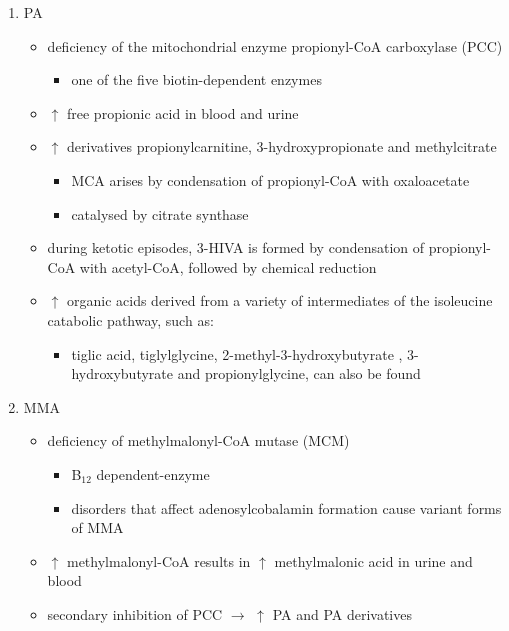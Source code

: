 \documentclass{scrartcl}
\begin{document}
\begin{enumerate}
\item PA
\label{sec:org8d2188c}
\begin{itemize}
\item deficiency of the mitochondrial enzyme propionyl-CoA carboxylase (PCC)
\begin{itemize}
\item one of the five biotin-dependent enzymes
\end{itemize}
\item \(\uparrow\) free propionic acid in blood and urine
\item \(\uparrow\) derivatives propionylcarnitine, 3-hydroxypropionate and methylcitrate
\begin{itemize}
\item MCA arises by condensation of propionyl-CoA with oxaloacetate
\item catalysed by citrate synthase
\end{itemize}
\item during ketotic episodes, 3-HIVA is formed by condensation of
propionyl-CoA with acetyl-CoA, followed by chemical reduction
\item \(\uparrow\) organic acids derived from a variety of intermediates of
the isoleucine catabolic pathway, such as:
\begin{itemize}
\item tiglic acid, tiglylglycine, 2-methyl-3-hydroxybutyrate ,
3-hydroxybutyrate and propionylglycine, can also be found
\end{itemize}
\end{itemize}

\item MMA
\label{sec:org2a13bfc}
\begin{itemize}
\item deficiency of methylmalonyl-CoA mutase (MCM)
\begin{itemize}
\item B\(_{\text{12}}\) dependent-enzyme
\item disorders that affect adenosylcobalamin formation cause variant
forms of MMA
\end{itemize}
\item \(\uparrow\) methylmalonyl-CoA results in \(\uparrow\) methylmalonic acid
in urine and blood
\item secondary inhibition of PCC \(\to\) \(\uparrow\) PA and PA derivatives
\end{itemize}


\end{enumerate}
\end{document}
